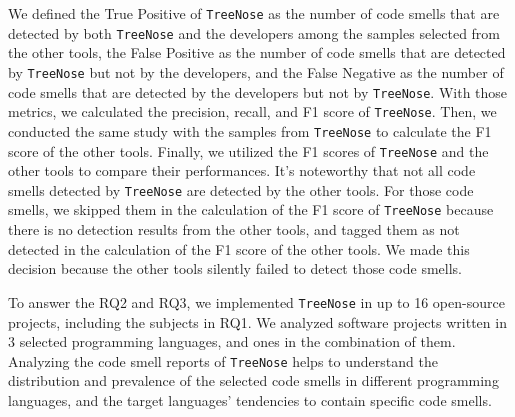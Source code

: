 We defined the True Positive of \texttt{TreeNose} as the number of code smells
that are detected by both \texttt{TreeNose} and the developers among the
samples selected from the other tools, the False Positive as the number of code
smells that are detected by \texttt{TreeNose} but not by the developers, and
the False Negative as the number of code smells that are detected by the
developers but not by \texttt{TreeNose}. With those metrics, we calculated the
precision, recall, and F1 score of \texttt{TreeNose}. Then, we conducted the
same study with the samples from \texttt{TreeNose} to calculate the F1 score of
the other tools. Finally, we utilized the F1 scores of \texttt{TreeNose} and
the other tools to compare their performances. It's noteworthy that not all
code smells detected by \texttt{TreeNose} are detected by the other tools. For
those code smells, we skipped them in the calculation of the F1 score of
\texttt{TreeNose} because there is no detection results from the other tools,
and tagged them as not detected in the calculation of the F1 score of the other
tools. We made this decision because the other tools silently failed to detect
those code smells.

To answer the RQ2 and RQ3, we implemented \texttt{TreeNose} in up to 16
open-source projects, including the subjects in RQ1. We analyzed software
projects written in 3 selected programming languages, and ones in the
combination of them.
 Analyzing the code smell reports of \texttt{TreeNose}
helps to understand the distribution and prevalence of the selected code smells
in different programming languages, and the target languages'
tendencies to contain specific code smells.




